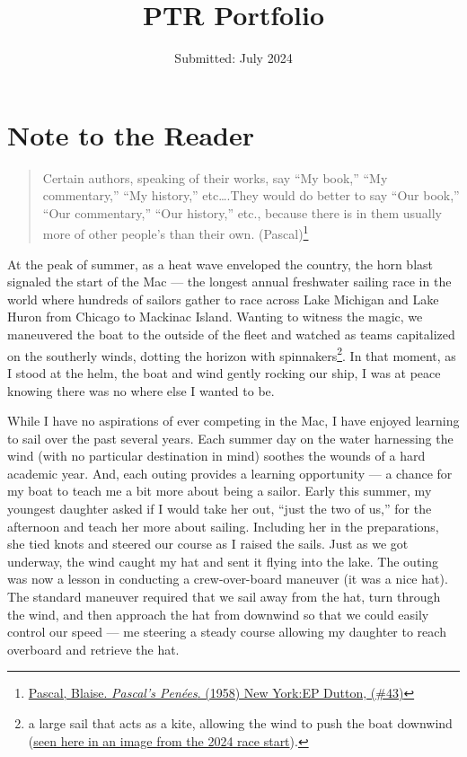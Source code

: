 \documentclass[
  letterpaper,
  DIV=11,
  numbers=noendperiod]{scrreprt}
\title{PTR Portfolio}
\author{}
\date{Submitted: July 2024}
\renewcommand*\contentsname{Table of contents}
\newcommand\contentsname{Table of contents}
\begin{document}
\maketitle

\renewcommand*\contentsname{Table of contents}
{
\hypersetup{linkcolor=}
\setcounter{tocdepth}{2}
\tableofcontents
}

\chapter*{Note to the Reader}\label{note-to-the-reader}


\begin{quote}
Certain authors, speaking of their works, say ``My book,'' ``My
commentary,'' ``My history,'' etc\ldots.They would do better to say
``Our book,'' ``Our commentary,'' ``Our history,'' etc., because there
is in them usually more of other people's than their own.
(Pascal)\footnote{\href{https://www.gutenberg.org/files/18269/18269-h/18269-h.htm\#p_43}{Pascal,
  Blaise. \emph{Pascal's Penées}. (1958) New York:EP Dutton, (\#43)}}
\end{quote}

At the peak of summer, as a heat wave enveloped the country, the horn
blast signaled the start of the Mac --- the longest annual freshwater
sailing race in the world where hundreds of sailors gather to race
across Lake Michigan and Lake Huron from Chicago to Mackinac Island.
Wanting to witness the magic, we maneuvered the boat to the outside of
the fleet and watched as teams capitalized on the southerly winds,
dotting the horizon with spinnakers\footnote{a large sail that acts as a
  kite, allowing the wind to push the boat downwind
  (\href{https://drive.google.com/file/d/1NrW5GJNlNJxoZi73NggF7sHlc6oJlpdx/view?usp=sharing}{seen
  here in an image from the 2024 race start}).}. In that moment, as I
stood at the helm, the boat and wind gently rocking our ship, I was at
peace knowing there was no where else I wanted to be.

While I have no aspirations of ever competing in the Mac, I have enjoyed
learning to sail over the past several years. Each summer day on the
water harnessing the wind (with no particular destination in mind)
soothes the wounds of a hard academic year. And, each outing provides a
learning opportunity --- a chance for my boat to teach me a bit more
about being a sailor. Early this summer, my youngest daughter asked if I
would take her out, ``just the two of us,'' for the afternoon and teach
her more about sailing. Including her in the preparations, she tied
knots and steered our course as I raised the sails. Just as we got
underway, the wind caught my hat and sent it flying into the lake. The
outing was now a lesson in conducting a crew-over-board maneuver (it was
a nice hat). The standard maneuver required that we sail away from the
hat, turn through the wind, and then approach the hat from downwind so
that we could easily control our speed --- me steering a steady course
allowing my daughter to reach overboard and retrieve the hat.
\end{document}

